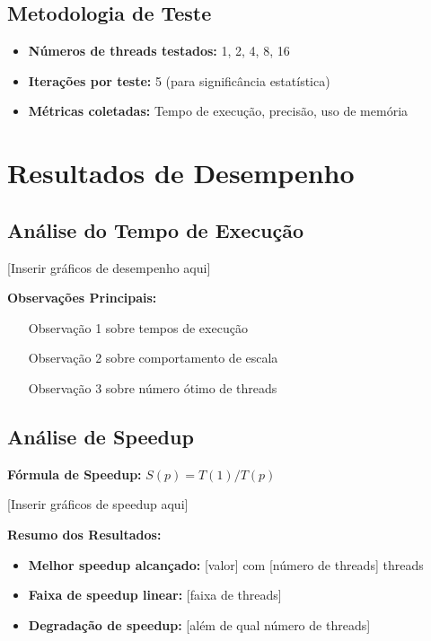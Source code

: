 \documentclass[a4paper,11pt]{article}
\begin{document}
\subsection{Metodologia de Teste}
\begin{itemize}
    \item \textbf{Números de threads testados:} 1, 2, 4, 8, 16
    \item \textbf{Iterações por teste:} 5 (para significância estatística)
    \item \textbf{Métricas coletadas:} Tempo de execução, precisão, uso de memória
\end{itemize}

\section{Resultados de Desempenho}

\subsection{Análise do Tempo de Execução}

[Inserir gráficos de desempenho aqui]

\textbf{Observações Principais:}
\begin{itemize}
    \item [Observação 1 sobre tempos de execução]
    \item [Observação 2 sobre comportamento de escala]
    \item [Observação 3 sobre número ótimo de threads]
\end{itemize}

\subsection{Análise de Speedup}

\textbf{Fórmula de Speedup:} $S(p) = T(1) / T(p)$

[Inserir gráficos de speedup aqui]

\textbf{Resumo dos Resultados:}
\begin{itemize}
    \item \textbf{Melhor speedup alcançado:} [valor] com [número de threads] threads
    \item \textbf{Faixa de speedup linear:} [faixa de threads]
    \item \textbf{Degradação de speedup:} [além de qual número de threads]
\end{itemize}
\end{document}
